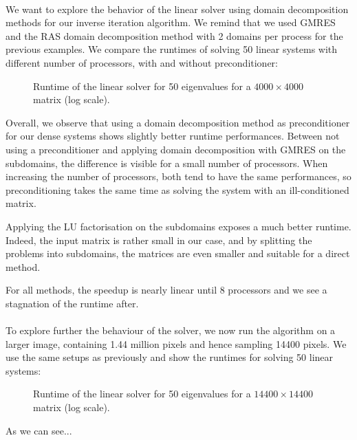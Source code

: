 \paragraph{}
We want to explore the behavior of the linear solver using domain decomposition methods for our inverse iteration algorithm.
We remind that we used GMRES and the RAS domain decomposition method with 2 domains per process for the previous examples.
We compare the runtimes of solving 50 linear systems with different number of processors, with and without preconditioner:

\begin{figure}[H]
 \centering
 
 \caption{Runtime of the linear solver for 50 eigenvalues for a \(4000 \times 4000\) matrix (log scale).}
\end{figure}

Overall, we observe that using a domain decomposition method as preconditioner for our dense systems shows slightly better runtime performances.
Between not using a preconditioner and applying domain decomposition with GMRES on the subdomains, the difference is visible for a small number of processors.
When increasing the number of processors, both tend to have the same performances, so preconditioning takes the same time as solving the system with an ill-conditioned matrix.

Applying the LU factorisation on the subdomains exposes a much better runtime.
Indeed, the input matrix is rather small in our case, and by splitting the problems into subdomains, the matrices are even smaller and suitable for a direct method.

For all methods, the speedup is nearly linear until 8 processors and we see a stagnation of the runtime after.

\paragraph{}
To explore further the behaviour of the solver, we now run the algorithm on a larger image, containing 1.44 million pixels and hence sampling 14400 pixels.
We use the same setups as previously and show the runtimes for solving 50 linear systems:

\begin{figure}[H]
 \centering
 
 \caption{Runtime of the linear solver for 50 eigenvalues for a \(14400 \times 14400\) matrix (log scale).}
\end{figure}

As we can see...
